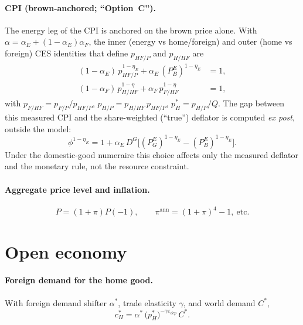 \documentclass[11pt]{article}
\newcommand{\DG}{D^{G}}
\newcommand{\PEB}{P^{E}_{B}}
\newcommand{\PEG}{P^{E}_{G}}
\begin{document}
\paragraph{CPI (brown-anchored; ``Option~C'').} The energy leg of the CPI is
anchored on the brown price alone. With $\alpha=\alpha_E+(1-\alpha_E)\alpha_F$,
the inner (energy vs home/foreign) and outer (home vs foreign) CES identities
that define $p_{HF/P}$ and $p_{H/HF}$ are
\begin{align}
(1-\alpha_E)\,p_{HF/P}^{1-\eta_E}+\alpha_E\,(\PEB)^{1-\eta_E}&=1, \label{eq:innernest}\\
(1-\alpha_F)\,p_{H/HF}^{1-\eta}+\alpha_F\,p_{F/HF}^{1-\eta}&=1, \label{eq:outernest}
\end{align}
with $p_{F/HF}=p_{F/P}/p_{HF/P}$, $p_{H/P}=p_{H/HF}\,p_{HF/P}$, $p_H^{*}=p_{H/P}/Q$.
The gap between this measured CPI and the share-weighted (``true'') deflator is
computed \emph{ex post}, outside the model:
\begin{equation}
\phi^{1-\eta_E}=1+\alpha_E\,\DG\bigl[(\PEG)^{1-\eta_E}-(\PEB)^{1-\eta_E}\bigr].
\end{equation}
Under the domestic-good numeraire this choice affects only the measured deflator
and the monetary rule, not the resource constraint.

\paragraph{Aggregate price level and inflation.}
\begin{equation}
P=(1+\pi)P(-1),\qquad
\pi^{\text{ann}}=(1+\pi)^4-1,\ \text{etc.}
\end{equation}

\section{Open economy}\label{sec:open}

\paragraph{Foreign demand for the home good.} With foreign demand shifter
$\alpha^{*}$, trade elasticity $\gamma$, and world demand $C^{*}$,
\begin{equation}
c_H^{*}=\alpha^{*}\,\bigl(p_H^{*}\bigr)^{-\gamma\varepsilon_{dcp}}\,C^{*}.
\end{equation}
\end{document}
